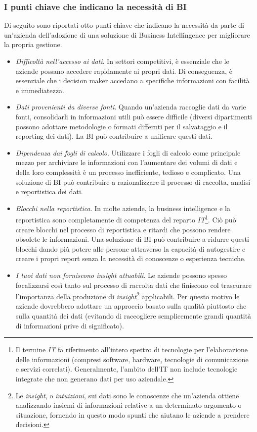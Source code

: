 \subsubsection{I punti chiave che indicano la necessità di BI}

Di seguito sono riportati otto punti chiave che indicano la necessità da parte di un'azienda dell'adozione di una soluzione di Business Intellingence per migliorare la propria gestione.\cite{boomper_book_of_bi}

\begin{itemize}
    \item \textit{Difficoltà nell'accesso ai dati}. In settori competitivi, è essenziale che le aziende possano accedere rapidamente ai propri dati. Di conseguenza, è essenziale che i decision maker accedano a specifiche informazioni con facilità e immediatezza.
    \item \textit{Dati provenienti da diverse fonti}. Quando un'azienda raccoglie dati da varie fonti, consolidarli in informazioni utili può essere difficile (diversi dipartimenti possono adottare metodologie o formati differnti per il salvataggio e il reporting dei dati). La BI può contribuire a unificare questi dati.
    \item \textit{Dipendenza dai fogli di calcolo}. Utilizzare i fogli di calcolo come principale mezzo per archiviare le informazioni con l'aumentare dei volumi di dati e della loro complessità è un processo inefficiente, tedioso e complicato. Una soluzione di BI può contribuire a razionalizzare il processo di raccolta, analisi e reportistica dei dati.
    \item \textit{Blocchi nella reportistica}. In molte aziende, la business intelligence e la reportistica sono completamente di competenza del reparto \textit{IT}\footnote{Il termine \textit{IT} fa riferimento all'intero spettro di tecnologie per l'elaborazione delle informazioni (compresi software, hardware, tecnologie di comunicazione e servizi correlati). Generalmente, l'ambito dell'IT non include tecnologie integrate che non generano dati per uso aziendale.\cite{gartner_it}}. Ciò può creare blocchi nel processo di reportistica e ritardi che possono rendere obsolete le informazioni. Una soluzione di BI può contribuire a ridurre questi blocchi dando più potere alle persone attraverso la capacità di autogestire e creare i propri report senza la necessità di conoscenze o esperienza tecniche.
    \item \textit{I tuoi dati non forniscono insight attuabili}. Le aziende possono spesso focalizzarsi così tanto sul processo di raccolta dati che finiscono col trascurare l'importanza della produzione di \textit{insight}\footnote{Le \textit{insight}, o \textit{intuizioni}, sui dati sono le conoscenze che un'azienda ottiene analizzando insiemi di informazioni relative a un determinato argomento o situazione, fornendo in questo modo spunti che aiutano le aziende a prendere decisioni.\cite{datarobot_insight}} applicabili. Per questo motivo le aziende dovrebbero adottare un approccio basato sulla qualità piuttosto che sulla quantità dei dati (evitando di raccogliere semplicemente grandi quantità di informazioni prive di significato).

\end{itemize}
